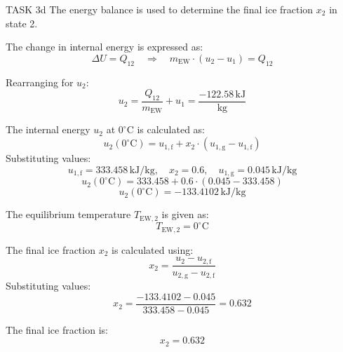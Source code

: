 TASK 3d  
The energy balance is used to determine the final ice fraction \( x_2 \) in state 2.  

The change in internal energy is expressed as:  
\[
\Delta U = Q_{12} \quad \Rightarrow \quad m_{\text{EW}} \cdot (u_2 - u_1) = Q_{12}
\]  

Rearranging for \( u_2 \):  
\[
u_2 = \frac{Q_{12}}{m_{\text{EW}}} + u_1 = \frac{-122.58 \, \text{kJ}}{\text{kg}}
\]  

The internal energy \( u_2 \) at \( 0^\circ\text{C} \) is calculated as:  
\[
u_2(0^\circ\text{C}) = u_{1,\text{f}} + x_2 \cdot (u_{1,\text{g}} - u_{1,\text{f}})
\]  
Substituting values:  
\[
u_{1,\text{f}} = 333.458 \, \text{kJ/kg}, \quad x_2 = 0.6, \quad u_{1,\text{g}} = 0.045 \, \text{kJ/kg}
\]  
\[
u_2(0^\circ\text{C}) = 333.458 + 0.6 \cdot (0.045 - 333.458)
\]  
\[
u_2(0^\circ\text{C}) = -133.4102 \, \text{kJ/kg}
\]  

The equilibrium temperature \( T_{\text{EW},2} \) is given as:  
\[
T_{\text{EW},2} = 0^\circ\text{C}
\]  

The final ice fraction \( x_2 \) is calculated using:  
\[
x_2 = \frac{u_2 - u_{2,\text{f}}}{u_{2,\text{g}} - u_{2,\text{f}}}
\]  
Substituting values:  
\[
x_2 = \frac{-133.4102 - 0.045}{333.458 - 0.045} = 0.632
\]  

The final ice fraction is:  
\[
x_2 = 0.632
\]